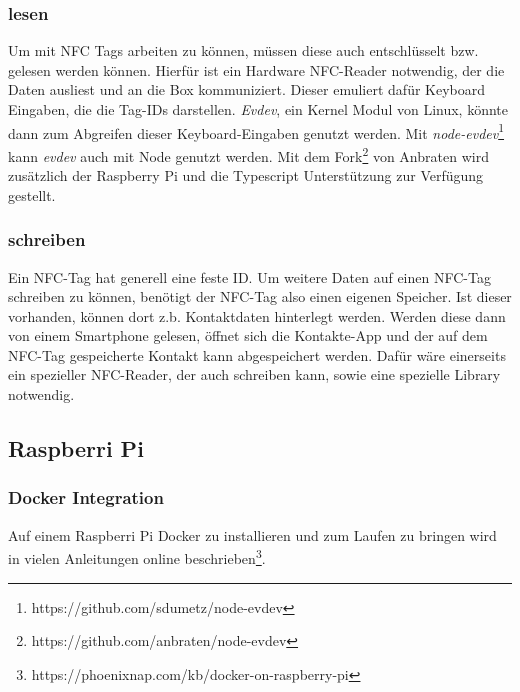 \documentclass[10pt, a4paper, draft]{article}
\begin{document}
\subsubsection{lesen}
Um mit NFC Tags arbeiten zu können, müssen diese auch entschlüsselt bzw. gelesen werden können.
Hierfür ist ein Hardware NFC-Reader notwendig, der die Daten ausliest und an die Box kommuniziert.
Dieser emuliert dafür Keyboard Eingaben, die die Tag-IDs darstellen.
\textit{Evdev}, ein Kernel Modul von Linux, könnte dann zum Abgreifen dieser Keyboard-Eingaben genutzt werden. Mit \textit{node-evdev}\footnote{https://github.com/sdumetz/node-evdev} kann \textit{evdev} auch mit Node genutzt werden. Mit dem Fork\footnote{https://github.com/anbraten/node-evdev} von Anbraten wird zusätzlich der Raspberry Pi und die Typescript Unterstützung zur Verfügung gestellt.

\subsubsection{schreiben}
Ein NFC-Tag hat generell eine feste ID.
Um weitere Daten auf einen NFC-Tag schreiben zu können, benötigt der NFC-Tag also einen eigenen Speicher.
Ist dieser vorhanden, können dort z.b. Kontaktdaten hinterlegt werden. Werden diese dann von einem Smartphone gelesen, öffnet sich die Kontakte-App und der auf dem NFC-Tag gespeicherte Kontakt kann abgespeichert werden.
Dafür wäre einerseits ein spezieller NFC-Reader, der auch schreiben kann, sowie eine spezielle Library notwendig.

\subsection{Raspberri Pi}
\subsubsection{Docker Integration}
Auf einem Raspberri Pi Docker zu installieren und zum Laufen zu bringen wird in vielen Anleitungen online beschrieben\footnote{https://phoenixnap.com/kb/docker-on-raspberry-pi}.
\end{document}

